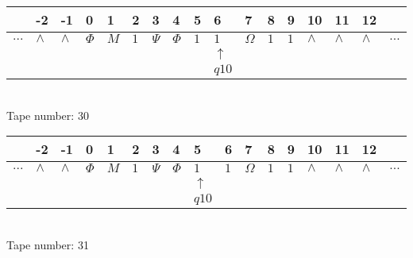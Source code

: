 \documentclass{article}
\begin{document}
\begin{table}[H]
\centering
\begin{tabular}{lllllllllllllllll}
 & -2 & -1 & 0 & 1 & 2 & 3 & 4 & 5 & 6 & 7 & 8 & 9 & 10 & 11 & 12 & \\
\hline
$...$ & \multicolumn{1}{|l|}{$\wedge$} & \multicolumn{1}{|l|}{$\wedge$} & \multicolumn{1}{|l|}{$\Phi$} & \multicolumn{1}{|l|}{$M$} & \multicolumn{1}{|l|}{$1$} & \multicolumn{1}{|l|}{$\Psi$} & \multicolumn{1}{|l|}{$\Phi$} & \multicolumn{1}{|l|}{$1$} & \multicolumn{1}{|l|}{$1$} & \multicolumn{1}{|l|}{$\Omega$} & \multicolumn{1}{|l|}{$1$} & \multicolumn{1}{|l|}{$1$} & \multicolumn{1}{|l|}{$\wedge$} & \multicolumn{1}{|l|}{$\wedge$} & \multicolumn{1}{|l|}{$\wedge$} & $...$\\
\hline
&  &  &  &  &  &  &  &  & $\uparrow$ &  &  &  &  &  &  &  \\
&  &  &  &  &  &  &  &  & $ q10 $ &  &  &  &  &  &  &  \\
\end{tabular}
\\
Tape number: 30
\noindent\makebox[\linewidth]{\hdashrule{\textwidth}{1pt}{1pt}}\end{table}

\begin{table}[H]
\centering
\begin{tabular}{lllllllllllllllll}
 & -2 & -1 & 0 & 1 & 2 & 3 & 4 & 5 & 6 & 7 & 8 & 9 & 10 & 11 & 12 & \\
\hline
$...$ & \multicolumn{1}{|l|}{$\wedge$} & \multicolumn{1}{|l|}{$\wedge$} & \multicolumn{1}{|l|}{$\Phi$} & \multicolumn{1}{|l|}{$M$} & \multicolumn{1}{|l|}{$1$} & \multicolumn{1}{|l|}{$\Psi$} & \multicolumn{1}{|l|}{$\Phi$} & \multicolumn{1}{|l|}{$1$} & \multicolumn{1}{|l|}{$1$} & \multicolumn{1}{|l|}{$\Omega$} & \multicolumn{1}{|l|}{$1$} & \multicolumn{1}{|l|}{$1$} & \multicolumn{1}{|l|}{$\wedge$} & \multicolumn{1}{|l|}{$\wedge$} & \multicolumn{1}{|l|}{$\wedge$} & $...$\\
\hline
&  &  &  &  &  &  &  & $\uparrow$ &  &  &  &  &  &  &  &  \\
&  &  &  &  &  &  &  & $ q10 $ &  &  &  &  &  &  &  &  \\
\end{tabular}
\\
Tape number: 31
\noindent\makebox[\linewidth]{\hdashrule{\textwidth}{1pt}{1pt}}\end{table}
\end{document}
